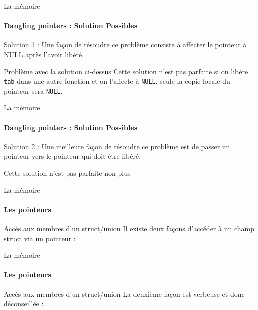 	\begin{frame}{La mémoire}
		\framesubtitle{Dangling pointers : Solution Possibles}
		\begin{block}{Solution 1 :}
			Une façon de résoudre ce problème consiste à affecter le pointeur à NULL après l'avoir libéré.
			\danglingPtrTwoSolutionTemp
		\end{block}
		\begin{alertblock}{Problème avec la solution ci-dessus}
			Cette solution n'est pas parfaite si on libére \texttt{tab} dans une autre fonction et on l'affecte à \texttt{NULL}, seule la copie locale du pointeur sera \texttt{NULL}.
		\end{alertblock}
	\end{frame}

	\begin{frame}{La mémoire}
		\framesubtitle{Dangling pointers : Solution Possibles}
		\begin{block}{Solution 2 :}
			Une meilleure façon de résoudre ce problème est de passer un pointeur vers le pointeur qui doit être libéré.
			\danglingPtrTwoSolution
		\end{block}
		\begin{alertblock}{Cette solution n'est pas parfaite non plus}
		\end{alertblock}
	\end{frame}
	
	\begin{frame}{La mémoire}
		\framesubtitle{Les pointeurs}
		\begin{block}{Accès aux membres d'un struct/union}
			Il existe deux façons d'accéder à un champ struct via un pointeur :\\ 
			\ptrStructSyntaxOne
		\end{block}
	\end{frame}

	\begin{frame}{La mémoire}
		\framesubtitle{Les pointeurs}
		\begin{block}{Accès aux membres d'un struct/union}
			La deuxième façon est verbeuse et donc déconseillée :\\
			\ptrStructSyntaxTwo
		\end{block}
	\end{frame}
	
